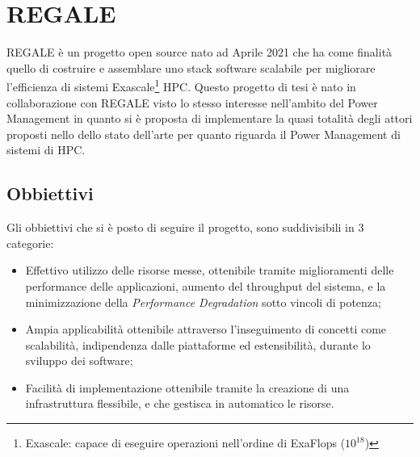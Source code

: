 \chapter{REGALE}
REGALE\cite{REGALE} è un progetto open source nato ad Aprile 2021 che ha come finalità quello di costruire e assemblare uno stack software scalabile per migliorare l'efficienza di sistemi Exascale\footnote{Exascale: capace di eseguire operazioni nell'ordine di ExaFlops ($10^{18}$)} HPC. Questo progetto di tesi è nato in collaborazione con REGALE visto lo stesso interesse nell'ambito del Power Management in quanto si è proposta di implementare la quasi totalità degli attori proposti nello dello stato dell'arte per quanto riguarda il Power Management di sistemi di HPC.

\section{Obbiettivi}
Gli obbiettivi che si è posto di seguire il progetto, sono suddivisibili in 3 categorie:

\begin{itemize}
    \item Effettivo utilizzo delle risorse messe, ottenibile tramite miglioramenti delle performance delle applicazioni, aumento del throughput del sistema, e la minimizzazione della \emph{Performance Degradation} sotto vincoli di potenza;
    \item Ampia applicabilità ottenibile attraverso l'inseguimento di concetti come scalabilità, indipendenza dalle piattaforme ed estensibilità, durante lo sviluppo dei software;
    \item Facilità di implementazione ottenibile tramite la creazione di una infrastruttura flessibile, e che gestisca in automatico le risorse.
\end{itemize}

